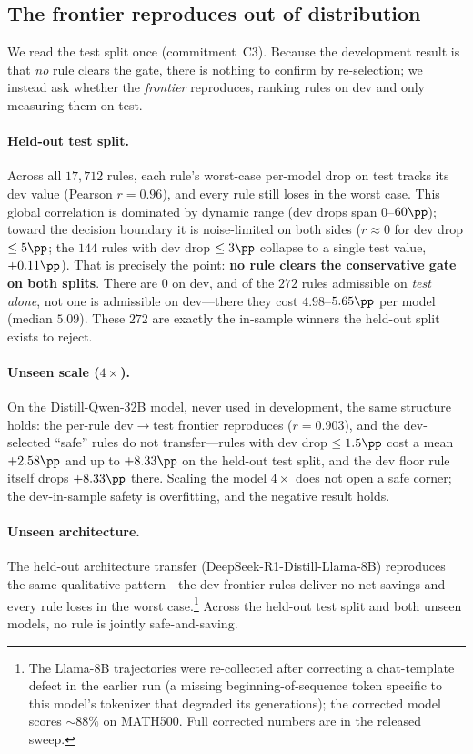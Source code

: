 \subsection{The frontier reproduces out of distribution}
We read the test split once (commitment~C3). Because the development result is
that \emph{no} rule clears the gate, there is nothing to confirm by re-selection;
we instead ask whether the \emph{frontier} reproduces, ranking rules on dev and
only measuring them on test.

\paragraph{Held-out test split.}
Across all $17{,}712$ rules, each rule's worst-case per-model drop on test tracks
its dev value (Pearson $r=0.96$), and every rule still loses in the worst case.
This global correlation is dominated by dynamic range (dev drops span
$0$--$60\pp$); toward the decision boundary it is noise-limited on both sides
($r\approx0$ for dev drop $\le5\pp$; the $144$ rules with dev drop $\le3\pp$
collapse to a single test value, $+0.11\pp$). That is precisely the point:
\textbf{no rule clears the conservative gate on both splits}. There are $0$ on
dev, and of the $272$ rules admissible on \emph{test alone}, not one is
admissible on dev---there they cost $4.98$--$5.65\pp$ per model (median $5.09$).
These $272$ are exactly the in-sample winners the held-out split exists to
reject.

\paragraph{Unseen scale ($4\times$).}
On the \mbox{Distill-Qwen-32B} model, never used in development, the same
structure holds: the per-rule dev$\rightarrow$test frontier reproduces
($r=0.903$), and the dev-selected ``safe'' rules do not transfer---rules with
dev drop $\le1.5\pp$ cost a mean $+2.58\pp$ and up to $+8.33\pp$ on the held-out
test split, and the dev floor rule itself drops $+8.33\pp$ there. Scaling the
model $4\times$ does not open a safe corner; the dev-in-sample safety is
overfitting, and the negative result holds.

\paragraph{Unseen architecture.}
The held-out architecture transfer (\mbox{DeepSeek-R1-Distill-Llama-8B})
reproduces the same qualitative pattern---the dev-frontier rules deliver no net
savings and every rule loses in the worst case.\footnote{The Llama-8B
trajectories were re-collected after correcting a chat-template defect in the
earlier run (a missing beginning-of-sequence token specific to this model's
tokenizer that degraded its generations); the corrected model scores
$\sim\!88\%$ on \textsc{MATH}500. Full corrected numbers are in the released
sweep.} Across the held-out test split and both unseen models, no rule is jointly
safe-and-saving.
